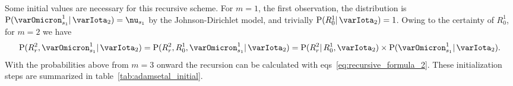 \documentclass[\ifafour a4paper,12pt,\else a5paper,10pt,\fi%
onecolumn,oneside,article,%
british%
]{memoir}
\theoremstyle{remark}
\theoremstyle{innote}
\newcommand*{\p}{\mathrm{P}}%
\renewcommand*{\|}{\mathpunct{|}}
\newcommand*{\eqns}{eqs}%
\newcommand*{\yI}{\varIota}
\newcommand*{\yMc}{\yI_2}
\newcommand*{\ynn}{\nu}
\begin{document}
\bigskip

Some initial values are necessary for this recursive scheme. For $m=1$, the
first observation, the distribution is $\p(\varOmicron^{1}_{s_1} \| \yMc)=\ynn_{s_1}$
by the Johnson-Dirichlet model, and trivially $\p(R^{1}_{0} \| \yMc)=1$.
Owing to the certainty of $R^1_0$, for $m=2$ we have
\begin{equation}
  \label{eq:initial_R2}
  \p(R^{2}_{r}, \varOmicron^{1}_{s_{1}} \|  \yMc)
  = \p(R^{2}_{r},R^{1}_{0}, \varOmicron^{1}_{s_{1}} \|  \yMc)
  = \p(R^{2}_{r} \| R^{1}_{0},  \yMc) \times
  \p( \varOmicron^{1}_{s_{1}} \|  \yMc).
\end{equation}
With the probabilities above from $m=3$ onward the recursion can be
calculated with \eqns~\eqref{eq:recursive_formula_2}. These initialization
steps are summarized in table~\ref{tab:adamsetal_initial}.
\end{document}
